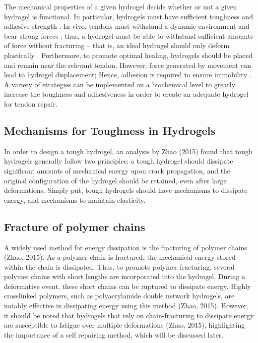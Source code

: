 The mechanical properties of a given hydrogel decide whether or not a given hydrogel is functional. In particular, hydrogels must have sufficient toughness and adhesive strength \autocite{freedmanEnhancedTendonHealing2022}. In vivo, tendons must withstand a dynamic environment and bear strong forces \autocite{ChenAdvancesApplicationHydrogel}; thus, a hydrogel must be able to withstand sufficient amounts of force without fracturing – that is, an ideal hydrogel should only deform plastically \autocite{freedmanEnhancedTendonHealing2022}. Furthermore, to promote optimal healing, hydrogels should be placed and remain near the relevant tendon. However, force generated by movement can lead to hydrogel displacement; Hence, adhesion is required to ensure immobility \autocite{freedmanEnhancedTendonHealing2022}. A variety of strategies can be implemented on a biochemical level to greatly increase the toughness and adhesiveness in order to create an adequate hydrogel for tendon repair.

\subsection{Mechanisms for Toughness in Hydrogels}
In order to design a tough hydrogel, an analysis by Zhao (2015) found that tough hydrogels generally follow two principles; a tough hydrogel should dissipate significant amounts of mechanical energy upon crack propagation, and the original configuration of the hydrogel should be retained, even after large deformations. Simply put, tough hydrogels should have mechanisms to dissipate energy, and mechanisms to maintain elasticity. 

\subsection{Fracture of polymer chains}
A widely used method for energy dissipation is the fracturing of polymer chains (Zhao, 2015). As a polymer chain is fractured, the mechanical energy stored within the chain is dissipated. Thus, to promote polymer fracturing, several polymer chains with short lengths are incorporated into the hydrogel. During a deformative event, these short chains can be ruptured to dissipate energy. Highly crosslinked polymers, such as polyacrylamide double network hydrogels, are notably effective in dissipating energy using this method (Zhao, 2015). However, it should be noted that hydrogels that rely on chain-fracturing to dissipate energy are susceptible to fatigue over multiple deformations (Zhao, 2015), highlighting the importance of a self repairing method, which will be discussed later.

